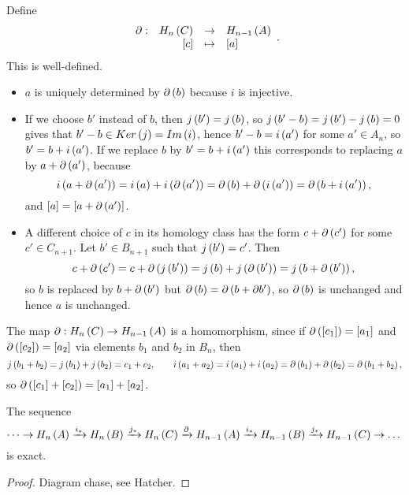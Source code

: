 Define
$$ \function[\partial]{H_n\rb{C}}{H_{n - 1}\rb{A}}{\sb{c}}{\sb{a}}. $$
This is well-defined.
\begin{itemize}
\item $ a $ is uniquely determined by $ \partial\left( b \right) $ because $ i $ is injective.
\item If we choose $ b' $ instead of $ b $, then $ j\left( b' \right) = j\left( b \right) $, so $ j\left( b' - b \right) = j\left( b' \right) - j\left( b \right) = 0 $ gives that $ b' - b \in Ker\left( j \right) = Im\left( i \right) $, hence $ b' - b = i\left( a' \right) $ for some $ a' \in A_n $, so $ b' = b + i\left( a' \right) $. If we replace $ b $ by $ b' = b + i\left( a' \right) $ this corresponds to replacing $ a $ by $ a + \partial\left( a' \right) $, because
$$ i\left( a + \partial\left( a' \right) \right) = i\left( a \right) + i\left( \partial\left( a' \right) \right) = \partial\left( b \right) + \partial\left( i\left( a' \right) \right) = \partial\left( b + i\left( a' \right) \right), $$
and $ \left[ a \right] = \left[ a + \partial\left( a' \right) \right] $.
\item A different choice of $ c $ in its homology class has the form $ c + \partial\left( c' \right) $ for some $ c' \in C_{n + 1} $. Let $ b' \in B_{n + 1} $ such that $ j\left( b' \right) = c' $. Then
$$ c + \partial\left( c' \right) = c + \partial\left( j\left( b' \right) \right) = j\left( b \right) + j\left( \partial\left( b' \right) \right) = j\left( b + \partial\left( b' \right) \right), $$
so $ b $ is replaced by $ b + \partial\left( b' \right) $ but $ \partial\left( b \right) = \partial\left( b + \partial b' \right) $, so $ \partial\left( b \right) $ is unchanged and hence $ a $ is unchanged.
\end{itemize}

\pagebreak

The map $ \partial : H_n\left( C \right) \to H_{n - 1}\left( A \right) $ is a homomorphism, since if $ \partial\left( \left[ c_1 \right] \right) = \left[ a_1 \right] $ and $ \partial\left( \left[ c_2 \right] \right) = \left[ a_2 \right] $ via elements $ b_1 $ and $ b_2 $ in $ B_n $, then
$$ j\left( b_1 + b_2 \right) = j\left( b_1 \right) + j\left( b_2 \right) = c_1 + c_2, \qquad i\left( a_1 + a_2 \right) = i\left( a_1 \right) + i\left( a_2 \right) = \partial\left( b_1 \right) + \partial\left( b_2 \right) = \partial\left( b_1 + b_2 \right), $$
so $ \partial\left( \left[ c_1 \right] + \left[ c_2 \right] \right) = \left[ a_1 \right] + \left[ a_2 \right] $.

\begin{theorem}
The sequence
$$ \dots \to H_n\left( A \right) \xrightarrow{i_*} H_n\left( B \right) \xrightarrow{j_*} H_n\left( C \right) \xrightarrow{\partial} H_{n - 1}\left( A \right) \xrightarrow{i_*} H_{n - 1}\left( B \right) \xrightarrow{j_*} H_{n - 1}\left( C \right) \to \dots $$
is exact.
\end{theorem}

\begin{proof}
Diagram chase, see Hatcher.
\end{proof}

